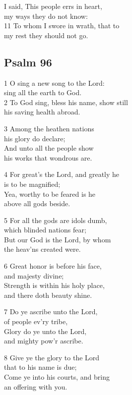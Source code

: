 I said, This people errs in heart,\\
my ways they do not know:\\
11 To whom I swore in wrath, that to\\
my rest they should not go.

\begin{center}
\quad{}\quad{}
\end{center}


\subsection*{Psalm 96}

1 O sing a new song to the Lord:\\
sing all the earth to God.\\
2 To God sing, bless his name, show still\\
his saving health abroad.

3 Among the heathen nations\\
his glory do declare;\\
And unto all the people show\\
his works that wondrous are.

4 For great’s the Lord, and greatly he\\
is to be magnified;\\
Yea, worthy to be feared is he\\
above all gods beside.

5 For all the gods are idols dumb,\\
which blinded nations fear;\\
But our God is the Lord, by whom\\
the heav’ns created were.

6 Great honor is before his face,\\
and majesty divine;\\
Strength is within his holy place,\\
and there doth beauty shine.

7 Do ye ascribe unto the Lord,\\
of people ev’ry tribe,\\
Glory do ye unto the Lord,\\
and mighty pow’r ascribe.

8 Give ye the glory to the Lord\\
that to his name is due;\\
Come ye into his courts, and bring\\
an offering with you.

